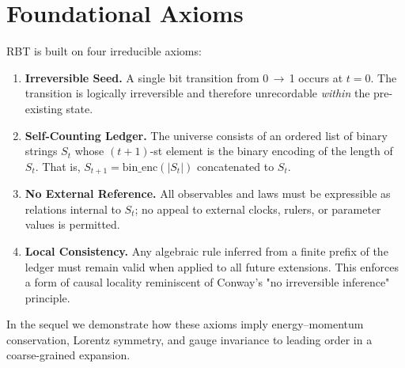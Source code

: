 \section{Foundational Axioms}
\label{sec:axioms}
RBT is built on four irreducible axioms:

\begin{enumerate}
  \item \textbf{Irreversible Seed.}  A single bit transition from 0\,$\to$\,1 occurs at $t=0$.  The transition is logically irreversible and therefore unrecordable \emph{within} the pre-existing state.
  \item \textbf{Self-Counting Ledger.}  The universe consists of an ordered list of binary strings $S_t$ whose $(t+1)$-st element is the binary encoding of the length of $S_t$.  That is, $S_{t+1} = \text{bin\_enc}(|S_t|)$ concatenated to $S_t$.
  \item \textbf{No External Reference.}  All observables and laws must be expressible as relations internal to $S_t$; no appeal to external clocks, rulers, or parameter values is permitted.
  \item \textbf{Local Consistency.}  Any algebraic rule inferred from a finite prefix of the ledger must remain valid when applied to all future extensions.  This enforces a form of causal locality reminiscent of Conway's "no irreversible inference" principle.
\end{enumerate}

In the sequel we demonstrate how these axioms imply energy–momentum conservation, Lorentz symmetry, and gauge invariance to leading order in a coarse-grained expansion.
\clearpage 